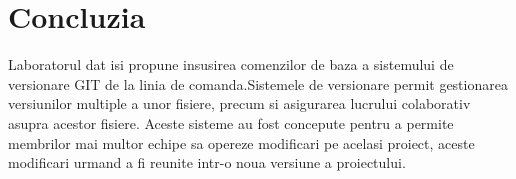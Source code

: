 \documentclass[12pt]{article}
\begin{document}
\section*{Concluzia}
Laboratorul dat isi propune insusirea comenzilor de baza a sistemului de versionare GIT de la linia de comanda.Sistemele de versionare permit gestionarea versiunilor multiple a unor fisiere, precum si asigurarea
lucrului colaborativ asupra acestor fisiere. Aceste sisteme au fost concepute pentru a permite membrilor mai multor echipe sa opereze
modificari pe acelasi proiect, aceste modificari urmand a fi reunite intr-o noua versiune a
proiectului.
\end{document}
